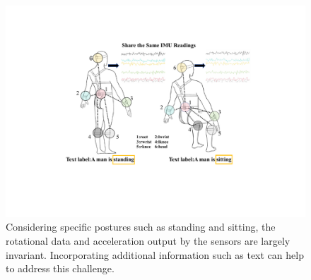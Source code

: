 \documentclass[letterpaper]{article} %
\begin{document}
\begin{figure}[t]
\centering
\includegraphics[width=1\columnwidth]{Same_Readings.pdf} 
\caption{Considering specific postures such as standing and sitting, the rotational data and acceleration output by the sensors are largely invariant. Incorporating additional information such as text can help to address this challenge.}
\label{fig1}
\end{figure}
\end{document}
